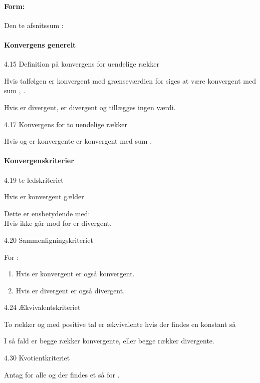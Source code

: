 \documentclass[
]{article}
\providecommand{\tightlist}{%
  \setlength{\itemsep}{0pt}\setlength{\parskip}{0pt}}
\begin{document}
\paragraph{Form:}\label{form-3}

Den {}\textquotesingle te afsnitssum {}:

\paragraph{Konvergens generelt}\label{konvergens-generelt}

4.15 Definition på konvergens for uendelige rækker

Hvis talfølgen {} er konvergent med grænseværdien {} for {} siges {} at
være konvergent med sum {}, {}.

Hvis {} er divergent, er {} divergent og tillægges ingen værdi.

4.17 Konvergens for to uendelige rækker

Hvis {} og {} er konvergente er {} konvergent med sum {}.

\paragraph{Konvergenskriterier}\label{konvergenskriterier}

4.19 {}\textquotesingle te ledskriteriet

Hvis {} er konvergent gælder

Dette er ensbetydende med:\\
Hvis {} ikke går mod {} for {} er {} divergent.

4.20 Sammenligningskriteriet

For {}:

\begin{enumerate}
\tightlist
\item
  Hvis {} er konvergent er {} også konvergent.
\item
  Hvis {} er divergent er {} også divergent.
\end{enumerate}

4.24 Ækvivalentskriteriet

To rækker {} og {} med positive tal er ækvivalente hvis der findes en
konstant {} så

I så fald er begge rækker konvergente, eller begge rækker divergente.

4.30 Kvotientkriteriet

Antag {} for alle {} og der findes et {} så {} for {}.
\end{document}
